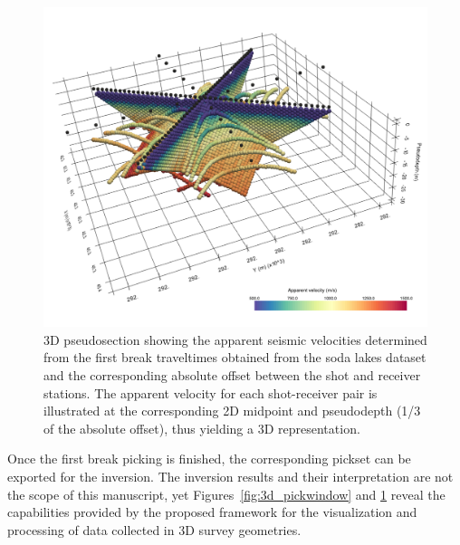 \documentclass[a4paper,fleqn]{cas-sc}
\begin{document}
\begin{figure}
	\centering
	\includegraphics[width=.75\textwidth]{figures/3d_pseudosection.pdf}
	\caption{3D pseudosection showing the apparent seismic velocities determined from the first break traveltimes obtained from the soda lakes dataset and the corresponding absolute offset between the shot and receiver stations. The apparent velocity for each shot-receiver pair is illustrated at the corresponding 2D midpoint and pseudodepth (1/3 of the absolute offset), thus yielding a 3D representation.}
	\label{fig:3d_pseudosection}
\end{figure}

Once the first break picking is finished, the corresponding pickset can be exported for the inversion.
The inversion results and their interpretation are not the scope of this manuscript, yet Figures~\ref{fig:3d_pickwindow} and \ref{fig:3d_pseudosection} reveal the capabilities provided by the proposed framework for the visualization and processing of data collected in 3D survey geometries.

\end{document}
